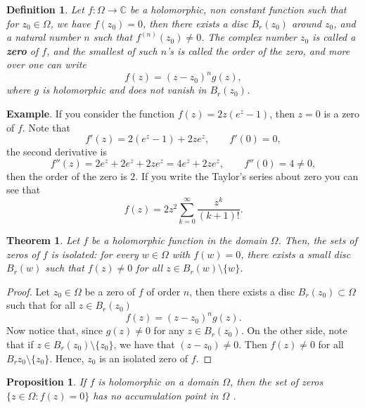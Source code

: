 \documentclass{amsart}
\newtheorem{thm}{Theorem}
\newtheorem{prop}{Proposition}
\newtheorem{mydef}{Definition}
\begin{document}
\begin{mydef}
Let \(f:\Omega \to \mathbb{C}\) be a holomorphic, non constant function such that for \(z_0\in \Omega\), we have \(f(z_0)= 0\), then there exists a disc  \(B_r(z_0)\) around \(z_0\), and a natural number \(n\) such that \(f^{(n)}(z_0) \neq 0\). The complex number \(z_0\) is called a \textbf{zero}  of \(f\), and the smallest of such \(n\)'s is called the order of the zero, and more over one can write \[ f(z) = (z-z_0)^n g(z), \] where \(g\) is holomorphic and does not vanish in \(B_r(z_0)\).
\end{mydef}

\textbf{Example}. If you consider the function \(f(z) = 2z (e^z -1)\), then \(z = 0\) is a zero of \(f\). Note that \[ f'(z) = 2(e^z -1) + 2ze^z, \qquad f'(0) = 0, \] the second derivative is \[ f''(z) = 2e^z + 2e^z + 2ze^z = 4e^z + 2ze^z, \qquad f''(0) = 4 \neq 0, \] then the order of the zero is \(2\).
If you write the Taylor's series about zero you can see that
\[ f(z) = 2z^2 \sum_{k=0}^{\infty} \frac{z^k}{(k+1)!}. \]


\begin{thm}
Let \(f\) be a holomorphic function in the domain \(\Omega\). Then, the sets of zeros of \(f\) is isolated: for every \(w\in \Omega\) with \(f(w) = 0\), there exists a small disc \(B_{r}(w)\) such that \(f(z) \neq 0\) for all \(z\in B_r(w)\setminus \{w\}\).
\end{thm}
\begin{proof}
Let \(z_0\in \Omega\) be a zero of \(f\) of  order \(n\),  then there exists a disc \(B_r(z_0)\subset \Omega\) such that for all \(z\in B_r(z_0)\) 
\[ f(z) = (z-z_0)^n g(z). \]
Now notice that, since \(g(z) \neq 0\) for any \(z \in B_r(z_0)\). On the other side, note that  if \(z \in B_r(z_0)\setminus \{z_0\}\), we have that  \((z-z_0)\neq 0\). Then \(f(z) \neq 0\) for all \(B_r{z_0}\setminus\{z_0\}\). Hence, \(z_0\) is an isolated zero of \(f\).
\end{proof}


\begin{prop}
If \(f\) is holomorphic on a domain  \(\Omega\), then the set of zeros \(\{z \in \Omega : f(z) = 0\}\) has no accumulation point in \(\Omega\) .
\end{prop}
\end{document}
